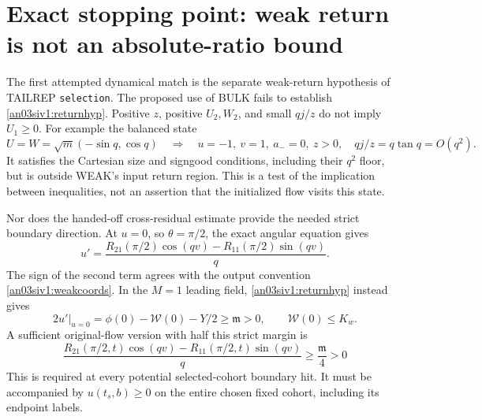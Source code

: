 \documentclass[11pt]{article}
\numberwithin{equation}{section}
\theoremstyle{remark}\newtheorem{remark}[proposition]{Remark}
\begin{document}
\section{Exact stopping point: weak return is not an absolute-ratio bound}
\label{an03siv1:stop}
The first attempted dynamical match is the separate weak-return
hypothesis of TAILREP \texttt{selection}. The proposed use of
BULK fails to establish \eqref{an03siv1:returnhyp}.
Positive $z$, positive $U_2,W_2$, and small $qj/z$ do not imply
$U_1\ge0$. For example the balanced state
\begin{equation}
 U=W=\sqrt m(-\sin q,\cos q)
 \quad\Longrightarrow\quad
 u=-1,\ v=1,\ a_-=0,\ z>0,\quad qj/z=q\tan q=O(q^2).
 \label{an03siv1:signexample}
\end{equation}
It satisfies the Cartesian size and signgood conditions, including
their $q^2$ floor, but is outside WEAK's input return region.
This is a test of the implication between inequalities, not an
assertion that the initialized flow visits this state.

Nor does the handed-off cross-residual estimate provide the needed
strict boundary direction. At $u=0$, so $\theta=\pi/2$, the exact
angular equation gives
\begin{equation}
 u'=\frac{R_{21}(\pi/2)\cos(qv)-R_{11}(\pi/2)\sin(qv)}q.
 \label{an03siv1:exactboundary}
\end{equation}
The sign of the second term agrees with the output convention
\eqref{an03siv1:weakcoords}. In the $M=1$ leading field,
\eqref{an03siv1:returnhyp} instead gives
\[
 2u'\big|_{u=0}=\phi(0)-\mathcal W(0)-Y/2\ge\mathfrak m>0,
 \qquad \mathcal W(0)\le K_w.
\]
A sufficient original-flow version with half this strict margin is
\begin{equation}
 \boxed{\quad
 \frac{R_{21}(\pi/2,t)\cos(qv)-R_{11}(\pi/2,t)\sin(qv)}q
       \ge\frac{\mathfrak m}{4}>0
 \quad}
 \label{an03siv1:missingreturn}
\end{equation}
This is required at every potential selected-cohort boundary hit.
It must be accompanied by $u(t_s,b)\ge0$ on the entire chosen
fixed cohort, including its endpoint labels.
\end{document}
